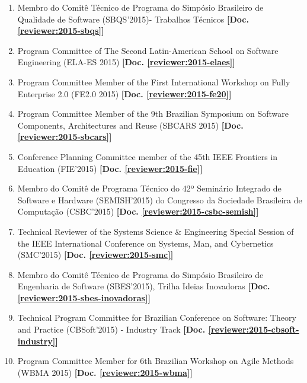 \documentclass[a4paper,oneside,10pt]{article}
\begin{document}
\begin{enumerate}
\renewcommand{\labelenumi}{{\large\bfseries\arabic{enumi}.}}

    \item Membro do Comitê Técnico de Programa do Simpósio Brasileiro de Qualidade de Software (SBQS'2015)- Trabalhos Técnicos \textbf{[Doc. \ref{reviewer:2015-sbqs}]}

    \item Program Committee of The Second Latin-American School on Software Engineering (ELA-ES 2015) \textbf{[Doc. \ref{reviewer:2015-elaes}]}

    \item Program Committee Member of the First International Workshop on Fully Enterprise 2.0 (FE2.0 2015) \textbf{[Doc. \ref{reviewer:2015-fe20}]}

    \item Program Committee Member of the 9th Brazilian Symposium on Software Components, Architectures and Reuse (SBCARS 2015) \textbf{[Doc. \ref{reviewer:2015-sbcars}]}

    \item Conference Planning Committee member of the 45th IEEE Frontiers in Education (FIE'2015) \textbf{[Doc. \ref{reviewer:2015-fie}]}

    \item Membro do Comitê de Programa Técnico do 42º Seminário Integrado de Software e Hardware (SEMISH'2015) do Congresso da Sociedade Brasileira de Computação (CSBC'2015) \textbf{[Doc. \ref{reviewer:2015-csbc-semish}]}

    \item Technical Reviewer of the Systems Science \& Engineering Special Session of the IEEE International Conference on Systems, Man, and Cybernetics (SMC'2015) \textbf{[Doc. \ref{reviewer:2015-smc}]}

    \item Membro do Comitê Técnico de Programa do Simpósio Brasileiro de Engenharia de Software (SBES'2015), Trilha Ideias Inovadoras \textbf{[Doc. \ref{reviewer:2015-sbes-inovadoras}]}

    \item Technical Program Committee for Brazilian Conference on Software: Theory and Practice (CBSoft'2015) - Industry Track \textbf{[Doc. \ref{reviewer:2015-cbsoft-industry}]}

    \item Program Committee Member for 6th Brazilian Workshop on Agile Methods (WBMA 2015) \textbf{[Doc. \ref{reviewer:2015-wbma}]}


\end{enumerate}
\end{document}
